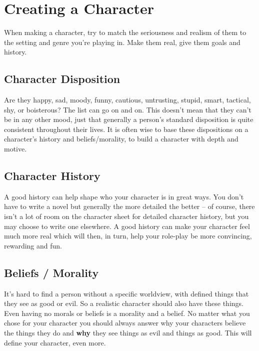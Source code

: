 \section{Creating a Character} \label{sec:creating_a_character}

When making a character, try to match the seriousness and realism of them to the setting and genre you’re playing in. Make them real, give them goals and history. %


\subsection{Character Disposition} \label{sec:character_disposition}

Are they happy, sad, moody, funny, cautious, untrusting, stupid, smart, tactical, shy, or boisterous? The list can go on and on. This doesn’t mean that they can’t be in any other mood, just that generally a person’s standard disposition is quite consistent throughout their lives. It is often wise to base these dispositions on a character’s history and beliefs/morality, to build a character with depth and motive.

\subsection{Character History} \label{sec:character_history}

A good history can help shape who your character is in great ways. You don’t have to write a novel but generally the more detailed the better – of course, there isn’t a lot of room on the character sheet for detailed character history, but you may choose to write one elsewhere. A good history can make your character feel much more real which will then, in turn, help your role-play be more convincing, rewarding and fun.

\subsection{Beliefs / Morality} \label{sec:beliefs_morality}

It’s hard to find a person without a specific worldview, with defined things that they see as good or evil. So a realistic character should also have these things. Even having no morals or beliefs is a morality and a belief. No matter what you chose for your character you should always answer why your characters believe the things they do and \textbf{why} they see things as evil and things as good. This will define your character, even more.

